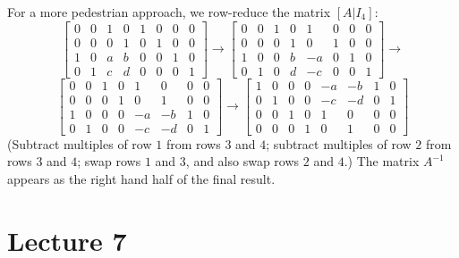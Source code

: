 \documentclass[a4paper]{amsart}
\renewenvironment{solution}{\SolutionInline}{\endSolutionInline}
\begin{document}
\begin{solution}
 For a more pedestrian approach, we row-reduce the matrix $[A|I_4]$:
 \[ \left[\begin{array}{cccc|cccc}
     0&0&1&0 & 1&0&0&0 \\
     0&0&0&1 & 0&1&0&0 \\
     1&0&a&b & 0&0&1&0 \\
     0&1&c&d & 0&0&0&1
    \end{array}\right]
    \to 
    \left[\begin{array}{cccc|cccc}
     0&0&1&0 &  1&0&0&0 \\
     0&0&0&1 &  0&1&0&0 \\
     1&0&0&b & -a&0&1&0 \\
     0&1&0&d & -c&0&0&1
    \end{array}\right]
    \to 
 \] \[
    \left[\begin{array}{cccc|cccc}
     0&0&1&0 &  1& 0&0&0 \\
     0&0&0&1 &  0& 1&0&0 \\
     1&0&0&0 & -a&-b&1&0 \\
     0&1&0&0 & -c&-d&0&1
    \end{array}\right]
    \to 
    \left[\begin{array}{cccc|cccc}
     1&0&0&0 & -a&-b&1&0 \\
     0&1&0&0 & -c&-d&0&1 \\
     0&0&1&0 &  1& 0&0&0 \\
     0&0&0&1 &  0& 1&0&0 
    \end{array}\right]    
 \]
 (Subtract multiples of row $1$ from rows $3$ and $4$; subtract
 multiples of row $2$ from rows $3$ and $4$; swap rows $1$ and $3$,
 and also swap rows $2$ and $4$.)  The matrix $A^{-1}$ appears as the
 right hand half of the final result.
\end{solution}

\section{Lecture 7}
\end{document}
